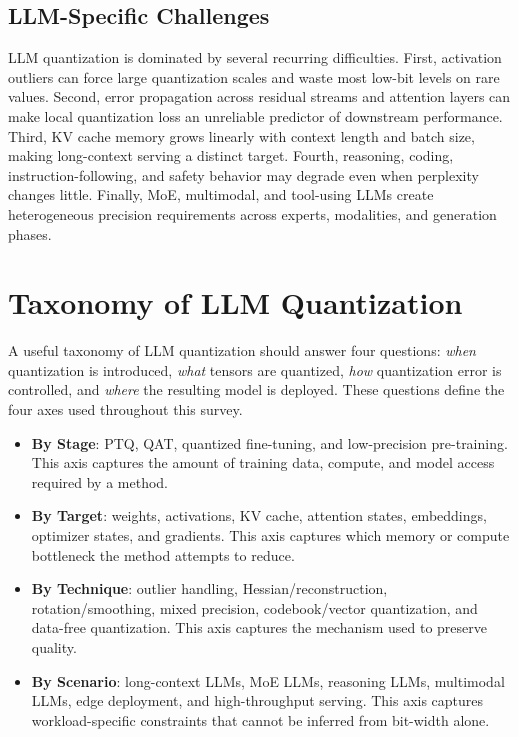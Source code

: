 \documentclass[journal,10pt]{IEEEtran}
\begin{document}
\subsection{LLM-Specific Challenges}
LLM quantization is dominated by several recurring difficulties. First, activation outliers can force large quantization scales and waste most low-bit levels on rare values. Second, error propagation across residual streams and attention layers can make local quantization loss an unreliable predictor of downstream performance. Third, KV cache memory grows linearly with context length and batch size, making long-context serving a distinct target. Fourth, reasoning, coding, instruction-following, and safety behavior may degrade even when perplexity changes little. Finally, MoE, multimodal, and tool-using LLMs create heterogeneous precision requirements across experts, modalities, and generation phases.

\section{Taxonomy of LLM Quantization}

A useful taxonomy of LLM quantization should answer four questions: \emph{when} quantization is introduced, \emph{what} tensors are quantized, \emph{how} quantization error is controlled, and \emph{where} the resulting model is deployed. These questions define the four axes used throughout this survey.

\begin{itemize}[leftmargin=*,nosep]
  \item \textbf{By Stage}: PTQ, QAT, quantized fine-tuning, and low-precision pre-training. This axis captures the amount of training data, compute, and model access required by a method.
  \item \textbf{By Target}: weights, activations, KV cache, attention states, embeddings, optimizer states, and gradients. This axis captures which memory or compute bottleneck the method attempts to reduce.
  \item \textbf{By Technique}: outlier handling, Hessian/reconstruction, rotation/smoothing, mixed precision, codebook/vector quantization, and data-free quantization. This axis captures the mechanism used to preserve quality.
  \item \textbf{By Scenario}: long-context LLMs, MoE LLMs, reasoning LLMs, multimodal LLMs, edge deployment, and high-throughput serving. This axis captures workload-specific constraints that cannot be inferred from bit-width alone.
\end{itemize}
\end{document}
